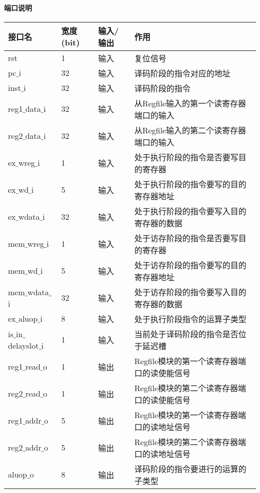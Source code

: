 \paragraph{端口说明}
\quad

\quad
	\begin{longtable}{|l|l|l|l|}
		\hline
		接口名 & 宽度(bit) & 输入/输出 & 作用 \\
		\hline
		rst & 1 & 输入 & 复位信号 \\
		\hline
		pc$\_$i & 32 & 输入 & 译码阶段的指令对应的地址 \\
		\hline
		inst$\_$i & 32 & 输入 & 译码阶段的指令 \\
		\hline
		reg1$\_$data$\_$i & 32 & 输入 & 从Regfile输入的第一个读寄存器端口的输入 \\
		\hline
		reg2$\_$data$\_$i & 32 & 输入 & 从Regfile输入的第二个读寄存器端口的输入 \\
		\hline
		ex$\_$wreg$\_$i & 1 & 输入 & 处于执行阶段的指令是否要写目的寄存器 \\
		\hline
		ex$\_$wd$\_$i & 5 & 输入 & 处于执行阶段的指令要写的目的寄存器地址 \\
		\hline
		ex$\_$wdata$\_$i & 32 & 输入 & 处于执行阶段的指令要写入目的寄存器的数据 \\
		\hline
		mem$\_$wreg$\_$i & 1 & 输入 & 处于访存阶段的指令是否要写目的寄存器 \\
		\hline
		mem$\_$wd$\_$i & 5 & 输入 & 处于访存阶段的指令要写的目的寄存器地址 \\
		\hline
		mem$\_$wdata$\_$i & 32 & 输入 & 处于访存阶段的指令要写入目的寄存器的数据 \\
		\hline
		ex$\_$aluop$\_$i & 8 & 输入 & 处于执行阶段指令的运算子类型 \\
		\hline
		is$\_$in$\_$delayslot$\_$i & 1 & 输入 & 当前处于译码阶段的指令是否位于延迟槽 \\
		\hline
		reg1$\_$read$\_$o & 1 & 输出 & Regfile模块的第一个读寄存器端口的读使能信号 \\
		\hline
		reg2$\_$read$\_$o & 1 & 输出 & Regfile模块的第二个读寄存器端口的读使能信号 \\
		\hline
		reg1$\_$addr$\_$o & 5 & 输出 & Regfile模块的第一个读寄存器端口的读地址信号 \\
		\hline
		reg2$\_$addr$\_$o & 5 & 输出 & Regfile模块的第二个读寄存器端口的读地址信号 \\
		\hline
		aluop$\_$o & 8 & 输出 & 译码阶段的指令要进行的运算的子类型 \\

\end{longtable}
